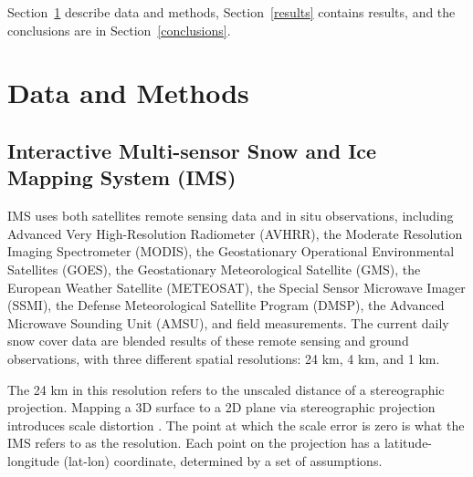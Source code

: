 Section~\ref{dataAndMethods} describe data and methods, Section~\ref{results} contains results, and the conclusions are in Section~\ref{conclusions}. 

\section{Data and Methods}\label{dataAndMethods}

\subsection{Interactive Multi-sensor Snow and Ice Mapping System (IMS)}

IMS \cite{NIC} uses both satellites remote sensing data and in situ observations,
including Advanced Very High-Resolution Radiometer
(AVHRR), the Moderate Resolution Imaging Spectrometer
(MODIS), the Geostationary Operational Environmental
Satellites (GOES), the Geostationary Meteorological
Satellite (GMS), the European Weather Satellite
(METEOSAT), the Special Sensor Microwave Imager
(SSMI), the Defense Meteorological Satellite Program
(DMSP), the Advanced Microwave Sounding Unit
(AMSU), and field measurements. The current daily snow cover data 
are blended results of these remote sensing and ground observations, with three different spatial resolutions: 24 km, 
4 km, and 1 km. 

The 24 km in this resolution refers to the unscaled distance of a stereographic projection. Mapping a 3D surface to a 2D plane via stereographic projection introduces scale distortion \cite{snyder1987map}. The point at which the scale error is zero is what the IMS refers to as the resolution. Each point on the projection has a latitude-longitude (lat-lon) coordinate, determined by a set of assumptions. 

